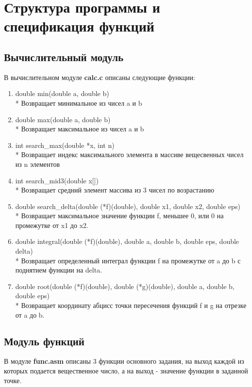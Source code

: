 \documentclass[a4paper,12pt,titlepage,finall]{article}
\begin{document}
\newpage

\section{Структура программы и спецификация функций}

\subsection{Вычислительный модуль}
В вычислительном модуле \textbf{calc.c} описаны следующие функции:

\begin{enumerate}
    \item double min(double a, double b)
    \\* Возвращает минимальное из чисел a и b
    \item double max(double a, double b)
    \\* Возвращает максимальное из чисел a и b
    \item int search\_max(double *x, int n)
    \\* Возвращает индекс максимального элемента в массиве вещесвенных чисел из n элементов
    \item int search\_mid3(double x[])
    \\* Возвращает средний элемент массива из 3 чисел по возрастанию
    \item double search\_delta(double (*f)(double), double x1, double x2, double eps)
    \\* Возвращает максимальное значение функции f, меньшее 0, или 0 на промежутке от x1 до x2.
    \item double integral(double (*f)(double), double a, double b, double eps, double delta)
    \\* Возвращает определенный интеграл функции f на промежутке от a до b с поднятием функции на delta.
    \item double root(double (*f)(double), double (*g)(double), double a, double b, double eps)
    \\* Возвращает координату абцисс точки пересечения функций f и g на отрезке от a до b.
\end{enumerate}

\subsection{Модуль функций}

В модуле \textbf{func.asm} описаны 3 функции основного задания, на выход каждой из которых подается вещественное число, а на выход - значение функции в заданной точке.
\end{document}
